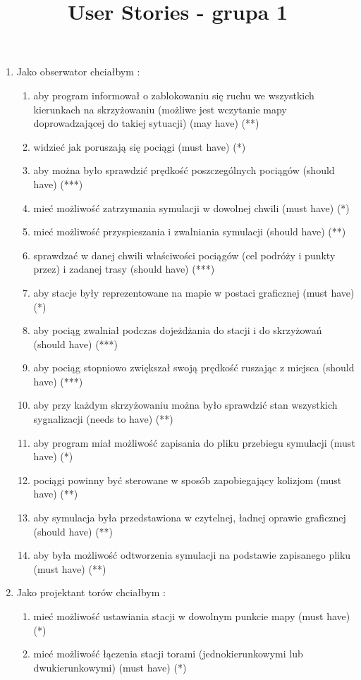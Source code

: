 \documentclass{article}
\begin{document}
\title{User Stories - grupa 1}
\maketitle
\begin{enumerate}
\item Jako obserwator chciałbym :
\begin{enumerate}
\item aby program informował o zablokowaniu się ruchu we wszystkich kierunkach na skrzyżowaniu (możliwe jest wczytanie mapy doprowadzającej do takiej sytuacji) (may have) (**)
\item widzieć jak poruszają się pociągi (must have) (*)
\item aby można było sprawdzić prędkość poszczególnych pociągów (should have) (***)
\item mieć możliwość zatrzymania symulacji w dowolnej chwili (must have) (*)
\item mieć możliwość przyspieszania i zwalniania symulacji (should have) (**)
\item sprawdzać w danej chwili właściwości pociągów (cel podróży i punkty przez) i zadanej trasy (should have) (***)
\item aby stacje były reprezentowane na mapie w postaci graficznej (must have) (*)
\item aby pociąg zwalniał podczas dojeżdżania do stacji i do skrzyżowań (should have) (***)
\item aby pociąg stopniowo zwiększał swoją prędkość ruszając z miejsca (should have) (***)
\item aby przy każdym skrzyżowaniu można było sprawdzić stan wszystkich sygnalizacji (needs to have) (**)
\item aby program miał możliwość zapisania do pliku przebiegu symulacji (must have) (*)
\item pociągi powinny być sterowane w sposób zapobiegający kolizjom (must have) (**)
\item aby symulacja była przedstawiona w czytelnej, ładnej oprawie graficznej (should have) (**)
\item aby była możliwość odtworzenia symulacji na podstawie zapisanego pliku (must have) (**)
\end {enumerate}
\item Jako projektant torów chciałbym :
\begin{enumerate}
\item mieć możliwość ustawiania stacji w dowolnym punkcie mapy (must have) (*)
\item mieć możliwość łączenia stacji torami (jednokierunkowymi lub dwukierunkowymi) (must have) (*)

\end{enumerate}
\end{enumerate}
\end{document}
